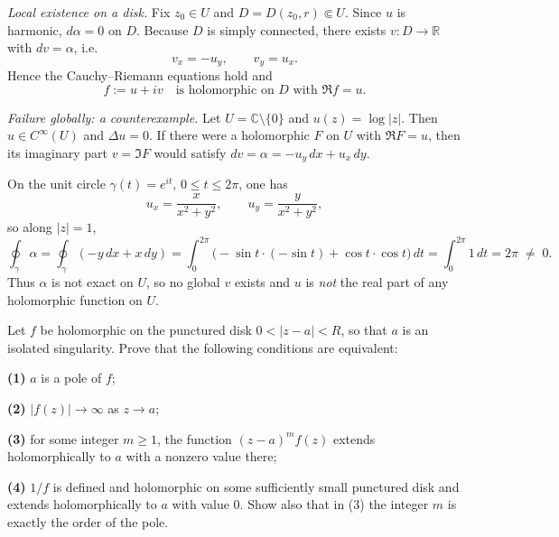 

\begin{solution}
\emph{Local existence on a disk.}
Fix $z_0\in U$ and $D=D(z_0,r)\Subset U$.
Since $u$ is harmonic, $d\alpha=0$ on $D$. Because $D$ is simply connected,
there exists $v:D\to\mathbb R$ with $dv=\alpha$, i.e.
\[
v_x=-u_y, \qquad v_y=u_x.
\]
Hence the Cauchy–Riemann equations hold and
\[
f:=u+iv \quad\text{is holomorphic on } D \text{ with } \Re f=u.
\]

\medskip
\emph{Failure globally: a counterexample.}
Let $U=\mathbb C\setminus\{0\}$ and $u(z)=\log|z|$. Then $u\in C^\infty(U)$ and $\Delta u=0$.
If there were a holomorphic $F$ on $U$ with $\Re F=u$, then its imaginary part $v=\Im F$
would satisfy $dv=\alpha=-u_y\,dx+u_x\,dy$.

\smallskip
On the unit circle $\gamma(t)=e^{it}$, $0\le t\le 2\pi$, one has
\[
u_x=\frac{x}{x^2+y^2}, \qquad u_y=\frac{y}{x^2+y^2},
\]
so along $|z|=1$,
\[
\oint_{\gamma}\alpha
=\oint_{\gamma}(-y\,dx+x\,dy)
=\int_0^{2\pi}\!\!\big(-\sin t\cdot(-\sin t)+\cos t\cdot\cos t\big)\,dt
=\int_0^{2\pi}\!1\,dt
=2\pi \;\neq\; 0.
\]
Thus $\alpha$ is not exact on $U$, so no global $v$ exists and $u$ is \emph{not}
the real part of any holomorphic function on $U$.
\end{solution}

\begin{problem}[CP-IV-0129]
\label{prob:cp-iv-0129}
Let $f$ be holomorphic on the punctured disk
$0<|z-a|<R$, so that $a$ is an isolated singularity.
Prove that the following conditions are equivalent:
\par\noindent\textbf{(1)} $a$ is a pole of $f$;
\par\noindent\textbf{(2)} $|f(z)|\to\infty$ as $z\to a$;
\par\noindent\textbf{(3)} for some integer $m\ge1$, the function $(z-a)^m f(z)$
extends holomorphically to $a$ with a nonzero value there;
\par\noindent\textbf{(4)} $1/f$ is defined and holomorphic on some sufficiently small
punctured disk and extends holomorphically to $a$ with value $0$.
Show also that in (3) the integer $m$ is exactly the order of the pole.
\end{problem}

